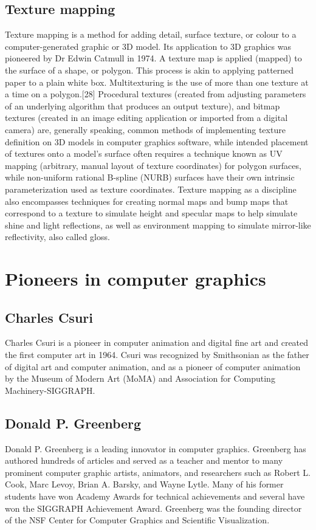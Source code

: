 \documentclass[a4paper]{article}
\begin{document}
\subsection{Texture mapping}
Texture mapping is a method for adding detail, surface texture, or colour to a computer-generated graphic or 3D model. Its application to 3D graphics was pioneered by Dr Edwin Catmull in 1974. A texture map is applied (mapped) to the surface of a shape, or polygon. This process is akin to applying patterned paper to a plain white box. Multitexturing is the use of more than one texture at a time on a polygon.[28] Procedural textures (created from adjusting parameters of an underlying algorithm that produces an output texture), and bitmap textures (created in an image editing application or imported from a digital camera) are, generally speaking, common methods of implementing texture definition on 3D models in computer graphics software, while intended placement of textures onto a model's surface often requires a technique known as UV mapping (arbitrary, manual layout of texture coordinates) for polygon surfaces, while non-uniform rational B-spline (NURB) surfaces have their own intrinsic parameterization used as texture coordinates. Texture mapping as a discipline also encompasses techniques for creating normal maps and bump maps that correspond to a texture to simulate height and specular maps to help simulate shine and light reflections, as well as environment mapping to simulate mirror-like reflectivity, also called gloss.
\newpage
 \section{Pioneers in computer graphics}
 \subsection{Charles Csuri}
  Charles Csuri is a pioneer in computer animation and digital fine art and created the first computer art in 1964. Csuri was recognized by Smithsonian as the father of digital art and computer animation, and as a pioneer of computer animation by the Museum of Modern Art (MoMA) and Association for Computing Machinery-SIGGRAPH.
  
  \subsection{Donald P. Greenberg}
  Donald P. Greenberg is a leading innovator in computer graphics. Greenberg has authored hundreds of articles and served as a teacher and mentor to many prominent computer graphic artists, animators, and researchers such as Robert L. Cook, Marc Levoy, Brian A. Barsky, and Wayne Lytle. Many of his former students have won Academy Awards for technical achievements and several have won the SIGGRAPH Achievement Award. Greenberg was the founding director of the NSF Center for Computer Graphics and Scientific Visualization.
\end{document}
